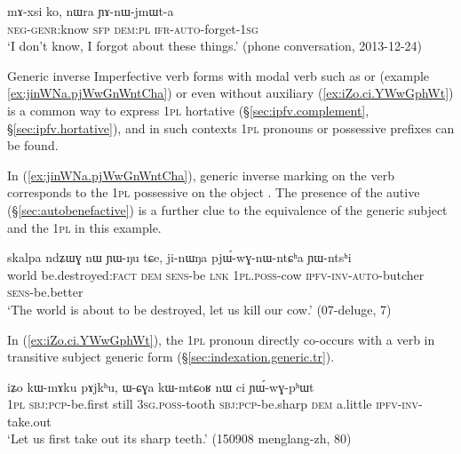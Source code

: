 \begin{exe}
\ex   \label{ex:mAxsi.YAnWjmWta}
 \gll mɤ-xsi ko, nɯra ɲɤ-nɯ-jmɯt-a \\
\textsc{neg}-\textsc{genr}:know \textsc{sfp} \textsc{dem}:\textsc{pl} \textsc{ifr}-\textsc{auto}-forget-\textsc{1sg} \\
\glt `I don't know, I forgot about these things.' (phone conversation, 2013-12-24)
\end{exe}

Generic inverse Imperfective verb forms with modal verb such as  or  (example \ref{ex:jinWNa.pjWwGnWntCha}) or even without auxiliary (\ref{ex:iZo.ci.YWwGphWt}) is a common way to express \textsc{1pl} hortative (§\ref{sec:ipfv.complement}, §\ref{sec:ipfv.hortative}), and in such contexts \textsc{1pl} pronouns or possessive prefixes can be found.

In (\ref{ex:jinWNa.pjWwGnWntCha}), generic inverse marking on the verb corresponds to the \textsc{1pl} possessive on the object . The presence of the autive  (§\ref{sec:autobenefactive}) is a further clue to the equivalence of the generic subject and the \textsc{1pl} in this example.

\begin{exe}
\ex   \label{ex:jinWNa.pjWwGnWntCha}
 \gll skalpa ndʑɯɣ nɯ ɲɯ-ŋu tɕe, ji-nɯŋa pjɯ́-wɣ-nɯ-ntɕʰa ɲɯ-ntsʰi \\
world be.destroyed:\textsc{fact} \textsc{dem} \textsc{sens}-be \textsc{lnk} \textsc{1pl}.\textsc{poss}-cow \textsc{ipfv}-\textsc{inv}-\textsc{auto}-butcher \textsc{sens}-be.better \\
\glt `The world is about to be destroyed, let us kill our cow.' (07-deluge, 7)
\end{exe}

In (\ref{ex:iZo.ci.YWwGphWt}), the \textsc{1pl} pronoun  directly co-occurs with a verb in transitive subject generic form (§\ref{sec:indexation.generic.tr}). 

\begin{exe}
\ex   \label{ex:iZo.ci.YWwGphWt}
 \gll  iʑo kɯ-mɤku pɤjkʰu, ɯ-ɕɣa kɯ-mtɕoʁ nɯ ci ɲɯ́-wɣ-pʰɯt \\
 \textsc{1pl} \textsc{sbj}:\textsc{pcp}-be.first still \textsc{3sg}.\textsc{poss}-tooth \textsc{sbj}:\textsc{pcp}-be.sharp \textsc{dem} a.little \textsc{ipfv}-\textsc{inv}-take.out \\
\glt `Let us first take out its sharp teeth.' (150908 menglang-zh, 80)
\end{exe}

